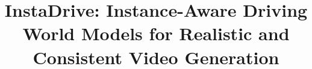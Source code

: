 \usepackage[rebuttal]{iccv}

\usepackage{graphicx}
\usepackage{amsmath}
\usepackage{amssymb}
\usepackage{booktabs}
\usepackage{mathtools}


\usepackage{multirow}
\usepackage{colortbl}
\usepackage{tcolorbox}
\usepackage{caption} %
\usepackage{array}


\setlength{\abovedisplayskip}{1pt}
\setlength{\belowdisplayskip}{-5pt}












\usepackage[pagebackref,breaklinks,colorlinks,allcolors=iccvblue]{hyperref}



\newcommand{\toreviewer}[1]{\vspace{0.0em}\noindent \textcolor{blue}{\textbf{#1 \hspace{0.2em}}}}
\newcommand{\issue}[1]{\vspace{0.0em}\noindent \textcolor{blue}{\textbf{#1 \hspace{0.2em}}}}




\setcounter{figure}{6}
\setcounter{table}{5}
\setcounter{equation}{9}


\def\paperID{13198} %
\def\confName{ICCV}
\def\confYear{2025}



\title{InstaDrive: Instance-Aware Driving World Models for Realistic and Consistent Video Generation}  %

